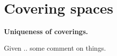 \section{Covering spaces}

\begin{theorem}
\textbf{Uniqueness of coverings.}

Given .. some comment on things.
\end{theorem}
